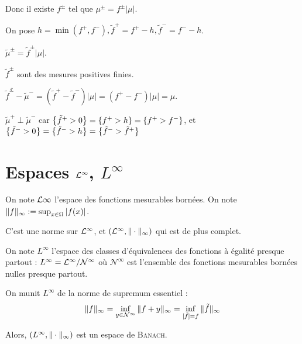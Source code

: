 \documentclass[10pt,a4paper,notitlepage ]{report}
\begin{document}
\begin{demo}
	Donc il existe $f^\pm$ tel que $\mu^\pm=f^\pm|\mu|$.
	
	On pose $h=\min(f^+,f^-), \tilde f^+ = f^+ - h, \tilde f^- = f^- - h$.
	
	$\tilde\mu^\pm = \tilde f^\pm |\mu|$.
	
	$\tilde f^\pm$ sont des mesures positives finies.
	
	$\tilde f^£ - \tilde \mu^- = (\tilde f^+ - \tilde f^-) |\mu| = (f^+ - f^-)|\mu| = \mu$.
	
	$\tilde\mu^+\perp\tilde\mu^-$ car $\set{\tilde f^+ > 0} = \set{f^+ > h} = \set{f^+>f^-}$, et $\set{\tilde f^- > 0} = \set{\tilde f^- > h} = \set{\tilde f^- > \tilde f^+}$

\end{demo}

\section{Espaces $\LL^\infty$, $L^\infty$}

\begin{definition}
On note $\LL \infty$ l'espace des fonctions mesurables bornées. On note $\norm[\infty] f := \sup_{x\in\Omega}|f(x)|$.

C'est une norme sur $\LL^\infty$, et $(\LL^\infty, \norm[\infty]\cdot )$ qui est de plus complet.

On note $L^\infty$ l'espace des classes d'équivalences des fonctions à égalité presque partout : $L^\infty = \LL^\infty / \mathcal N^\infty$ où $\mathcal N^\infty$ est l'ensemble des fonctions mesurables bornées nulles presque partout.

On munit $L^\infty$ de la norme de supremum essentiel :
\[
\norm[\infty]f = \inf_{y\in\mathcal N^\infty} \norm[\infty]{f+y} = \inf_{[\tilde f]=f} \norm[\infty]{\tilde f}
\]

\end{definition}

\begin{propriete}

Alors, $(L^\infty, \norm[\infty]\cdot)$ est un espace de \textsc{Banach}.

\end{propriete}
\end{document}
